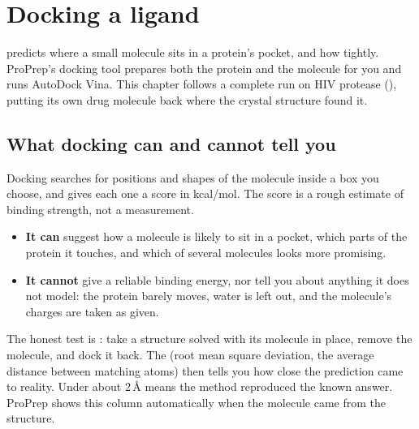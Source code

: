 \chapter{Docking a ligand}
\label{ch:docking}

 predicts where a small molecule sits in a protein's pocket, and
how tightly. ProPrep's docking tool prepares both the protein and the molecule
for you and runs AutoDock Vina. This chapter follows a complete run on HIV
protease (), putting its own drug molecule back where the crystal
structure found it.

\begin{glance}
\end{glance}

\section{What docking can and cannot tell you}

Docking searches for positions and shapes of the molecule inside a box you
choose, and gives each one a score in kcal/mol. The score is a rough estimate
of binding strength, not a measurement.

\begin{itemize}
  \item \textbf{It can} suggest how a molecule is likely to sit in a pocket,
        which parts of the protein it touches, and which of several molecules
        looks more promising.
  \item \textbf{It cannot} give a reliable binding energy, nor tell you about
        anything it does not model: the protein barely moves, water is left
        out, and the molecule's charges are taken as given.
\end{itemize}

The honest test is : take a structure solved with its molecule
in place, remove the molecule, and dock it back. The  (root mean
square deviation, the average distance between matching atoms) then tells you
how close the prediction came to reality. Under about 2\,\AA{} means the
method reproduced the known answer. ProPrep shows this column
automatically when the molecule came from the structure.

